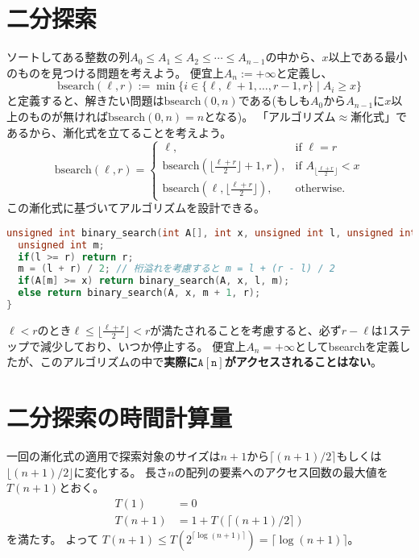 \documentclass[a4paper,twoside,onecolumn,openany,article,10pt]{memoir}
\theoremstyle{remark}
\begin{document}
\section{二分探索}
ソートしてある整数の列$A_0\le A_1\le A_2\le \dotsb\le A_{n-1}$の中から、$x$以上である最小のものを見つける問題を考えよう。
便宜上$A_n := +\infty$と定義し、
\begin{equation*}
\mathrm{bsearch}(\ell, r) := \min\bigl\{i\in\{\ell,\ell+1,\dotsc,r-1,r\}\mid A_i\ge x\bigr\}
\end{equation*}
と定義すると、解きたい問題は$\mathrm{bsearch}(0,n)$である(もしも$A_0$から$A_{n-1}$に$x$以上のものが無ければ$\mathrm{bsearch}(0,n)=n$となる)。
「アルゴリズム$\approx$漸化式」であるから、漸化式を立てることを考えよう。
\begin{equation*}
\mathrm{bsearch}(\ell, r) =
\begin{cases}
\ell,& \text{if } \ell = r\\
\mathrm{bsearch}(\lfloor \frac{\ell + r}2\rfloor+1, r),& \text{if } A_{\lfloor\frac{\ell + r}2\rfloor} < x\\
\mathrm{bsearch}(\ell, \lfloor \frac{\ell + r}2\rfloor),& \text{otherwise.}
\end{cases}
\end{equation*}
この漸化式に基づいてアルゴリズムを設計できる。

\begin{lstlisting}[basicstyle=\ttfamily\normalsize,showstringspaces=false,language=C,frame=single]
unsigned int binary_search(int A[], int x, unsigned int l, unsigned int r){
  unsigned int m;
  if(l >= r) return r;
  m = (l + r) / 2; // 桁溢れを考慮すると m = l + (r - l) / 2
  if(A[m] >= x) return binary_search(A, x, l, m);
  else return binary_search(A, x, m + 1, r);
}
\end{lstlisting}
$\ell<r$のとき$\ell \le \lfloor \frac{\ell+r}2\rfloor < r$が満たされることを考慮すると、必ず$r-\ell$は1ステップで減少しており、いつか停止する。
便宜上$A_n=+\infty$として\textrm{bsearch}を定義したが、このアルゴリズムの中で\textbf{実際に$\mathtt{A[n]}$がアクセスされることはない}。

\section{二分探索の時間計算量}
一回の漸化式の適用で探索対象のサイズは$n+1$から$\lceil (n+1)/2\rceil$もしくは$\lfloor (n+1)/2\rfloor$に変化する。
長さ$n$の配列の要素へのアクセス回数の最大値を$T(n+1)$とおく。
\begin{align*}
T(1)  &= 0\\
T(n+1)&= 1 + T(\lceil (n+1)/2\rceil)
\end{align*}
を満たす。
よって $T(n+1)\le T(2^{\lceil \log (n+1)\rceil}) = \lceil \log (n+1) \rceil$。
\end{document}
